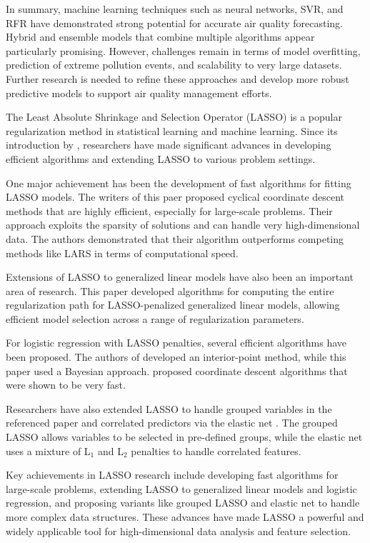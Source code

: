\documentclass{book}
\numberwithin{equation}{section}
\numberwithin{figure}{section}
\begin{document}
In summary, machine learning techniques such as neural networks, SVR, and RFR have demonstrated strong potential for accurate air quality forecasting. Hybrid and ensemble models that combine multiple algorithms appear particularly promising. However, challenges remain in terms of model overfitting, prediction of extreme pollution events, and scalability to very large datasets. Further research is needed to refine these approaches and develop more robust predictive models to support air quality management efforts.

The Least Absolute Shrinkage and Selection Operator (LASSO) is a popular regularization method in statistical learning and machine learning. Since its introduction by \citep{tibshirani1996regression}, researchers have made significant advances in developing efficient algorithms and extending LASSO to various problem settings.

One major achievement has been the development of fast algorithms for fitting LASSO models. The writers of this paer \citep{friedman2010regularization} proposed cyclical coordinate descent methods that are highly efficient, especially for large-scale problems. Their approach exploits the sparsity of solutions and can handle very high-dimensional data. The authors demonstrated that their algorithm outperforms competing methods like LARS in terms of computational speed.

Extensions of LASSO to generalized linear models have also been an important area of research. This paper \citep{park2007l1} developed algorithms for computing the entire regularization path for LASSO-penalized generalized linear models, allowing efficient model selection across a range of regularization parameters.

For logistic regression with LASSO penalties, several efficient algorithms have been proposed. The authors of  \citep{koh2007interior} developed an interior-point method, while this paper \citep{genkin2007large} used a Bayesian approach. \citep{wu2008coordinate} proposed coordinate descent algorithms that were shown to be very fast.

Researchers have also extended LASSO to handle grouped variables in the referenced paper \citep{yuan2006model} and correlated predictors via the elastic net \citep{zou2005regularization}. The grouped LASSO allows variables to be selected in pre-defined groups, while the elastic net uses a mixture of L$_1$ and L$_2$ penalties to handle correlated features.

Key achievements in LASSO research include developing fast algorithms for large-scale problems, extending LASSO to generalized linear models and logistic regression, and proposing variants like grouped LASSO and elastic net to handle more complex data structures. These advances have made LASSO a powerful and widely applicable tool for high-dimensional data analysis and feature selection.
\end{document}
